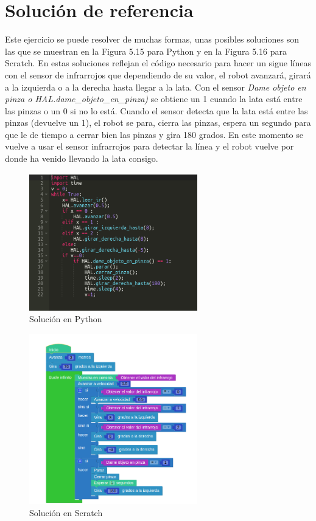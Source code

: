 \section{Solución de referencia}
Este ejercicio se puede resolver de muchas formas, unas posibles soluciones son las que se muestran en la Figura 5.15 para Python y  en la Figura 5.16 para Scratch. 
En estas soluciones reflejan el código necesario para hacer un sigue líneas con el sensor de infrarrojos que dependiendo de su valor, el robot avanzará, girará a la izquierda o a la derecha hasta llegar a la lata. Con el sensor \textit{Dame objeto en pinza o HAL.dame\_objeto\_en\_pinza)} se obtiene un 1 cuando la lata está entre las pinzas o un 0 si no lo está. Cuando el sensor detecta que la lata está entre las pinzas (devuelve un 1), el robot se para, cierra las pinzas, espera un segundo para que le de tiempo a cerrar bien las pinzas y gira 180 grados. En este momento se vuelve a usar el sensor infrarrojos para detectar la línea y el robot vuelve por donde ha venido llevando la lata consigo.

\begin{figure}[H]
    \centering
    \includegraphics[width=0.65\textwidth, height=0.45\textwidth]{chapters/images/solucionppython.png}
    \caption{Solución en Python}
    \label{fig:my_label}
\end{figure}

\begin{figure}[H]
    \centering
    \includegraphics[width=0.65\textwidth, height=0.45\textwidth]{chapters/images/solucionpscratch.png}
    \caption{Solución en Scratch}
    \label{fig:my_label}
\end{figure}